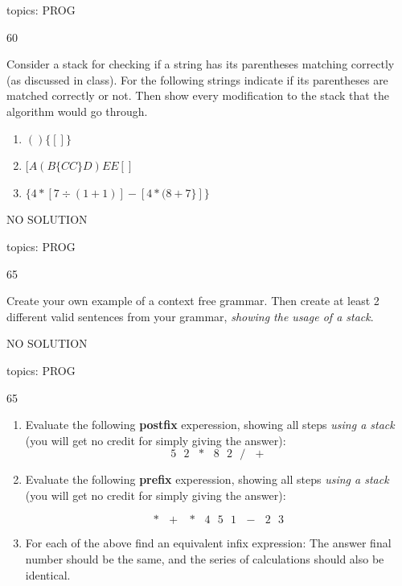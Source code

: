 \documentclass[12 pt]{article}
\begin{document}
\begin{itemize}
{}
{

}{}{topics: PROG}


\ex
{}{60}
{
Consider a stack for checking if a string has its parentheses matching correctly (as discussed in class).  For the following strings indicate if its parentheses are matched correctly or not.  Then show every modification to the stack that the algorithm would go through.

\begin{enumerate}

\item $( ) \{  [  ] \}$

\item $[  A ( B \{  C  C  \} D  )  E E   [ ] $

\item $\{  4 *  [ 7 \div  ( 1 + 1  )  ] - [ 4 * (  8 + 7  \} ] \}$

\end{enumerate}

}
{
NO SOLUTION

}{}{topics: PROG}



\ex
{}{65}
{
Create your own example of a context free grammar.  Then create at least 2 different valid sentences from your grammar, \emph{showing the usage of a stack}.

}
{
NO SOLUTION

}{}{topics: PROG}




\ex
{}{65}
{
\begin{enumerate}

\item
Evaluate the following {\bf postfix} experession, showing all steps \emph{using a stack} (you will get no credit for simply giving the answer):
$$ 5  \ \ \  2  \ \ \  *  \ \ \  8  \ \ \  2  \ \ \  /  \ \ \  +$$



\item
Evaluate the following {\bf prefix} experession, showing all steps \emph{using a stack} (you will get no credit for simply giving the answer):

$$  * \ \ \ + \ \ \ * \ \ \ 4 \ \ \  5 \ \ \ 1 \ \ \ - \ \ \ 2  \ \ \ 3  $$

\item For each of the above find an equivalent infix expression: The answer final number should be the same, and the series of calculations should also be identical.


\end{enumerate}}
\end{itemize}
\end{document}
